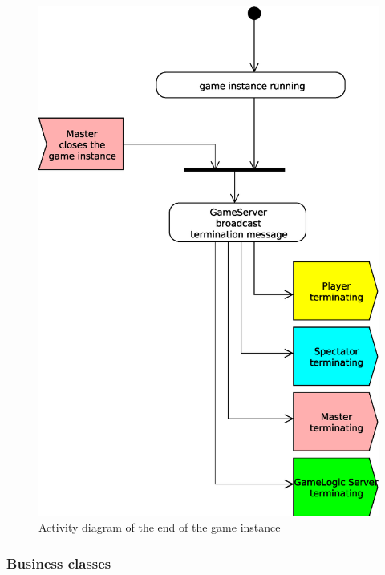 \begin{figure}[htbp!]
\begin{center}
\includegraphics[scale=0.5]{Figures/_integration_activity_leave_game_instance}
\caption{Activity diagram of the end of the game instance}
\label{F_integration_activity_leave_game_instance}
\end{center}
\end{figure}

\newpage

\subsubsection{Business classes}
\label{SSS_integration_analysis}

